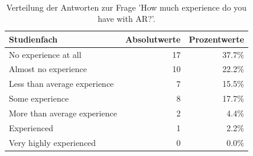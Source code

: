 \begin{table}
	\caption{Verteilung der Antworten zur Frage 'How much experience do you have with AR?'.}~\label{tab:sc_results_age}
	
	\setlength\tabcolsep{3pt}
	\renewcommand{\arraystretch}{1.4}%
	\begin{tabularx}{\textwidth}{ | x || r | r | }
		\hline
		Studienfach 						& Absolutwerte 	& Prozentwerte \\ \hline\hline
		[A1] No experience at all 			& 17 			& 37.7\% \\ \hline
		[A2] Almost no experience 			& 10 			& 22.2\% \\ \hline
		[A3] Less than average experience 	& 7 			& 15.5\% \\ \hline
		[A4] Some experience 				& 8 			& 17.7\% \\ \hline
		[A5] More than average experience 	& 2 			& 4.4\% \\ \hline
		[A6] Experienced 					& 1 			& 2.2\% \\ \hline
		[A7] Very highly experienced 		& 0 			& 0.0\% \\ \hline
	\end{tabularx}
\end{table}

